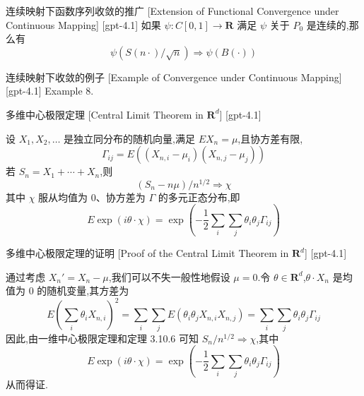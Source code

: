 \documentclass[UTF8]{ctexart}
\begin{document}
    
    
    \begin{thm}
        {连续映射下函数序列收敛的推广}
        [Extension of Functional Convergence under Continuous Mapping]
        [gpt-4.1]
        如果 $\psi : C[0, 1] \to \mathbf{R}$ 满足 $\psi$ 关于 $P_0$ 是连续的,那么有
\[
\psi(S(n\cdot)/\sqrt{n}) \Rightarrow \psi(B(\cdot))
\]

    \end{thm}
    
    
    
    \begin{xmp}
        {连续映射下收敛的例子}
        [Example of Convergence under Continuous Mapping]
        [gpt-4.1]
        Example 8.
    \end{xmp}
    
    
    
    \begin{thm}
        {多维中心极限定理}
        [Central Limit Theorem in $\mathbf{R}^d$]
        [gpt-4.1]
        
设 $X_1, X_2, \ldots$ 是独立同分布的随机向量,满足 $E X_n = \mu$,且协方差有限,
\[
\Gamma_{ij} = E \left( (X_{n,i} - \mu_i)(X_{n,j} - \mu_j) \right)
\]
若 $S_n = X_1 + \cdots + X_n$,则
\[(S_n - n\mu)/n^{1/2} \Rightarrow \chi\]
其中 $\chi$ 服从均值为 $0$、协方差为 $\Gamma$ 的多元正态分布,即
\[
E \exp(i \theta \cdot \chi) = \exp \left( - \frac{1}{2} \sum_i \sum_j \theta_i \theta_j \Gamma_{ij} \right)
\]

    \end{thm}
    
    
    
    \begin{prf}
        {多维中心极限定理的证明}
        [Proof of the Central Limit Theorem in $\mathbf{R}^d$]
        [gpt-4.1]
        
通过考虑 $X_n' = X_n - \mu$,我们可以不失一般性地假设 $\mu = 0$.令 $\theta \in \mathbf{R}^d$,$\theta \cdot X_n$ 是均值为 0 的随机变量,其方差为
\[
E \left( \sum_i \theta_i X_{n,i} \right)^2 = \sum_i \sum_j E \left( \theta_i \theta_j X_{n,i} X_{n,j} \right) = \sum_i \sum_j \theta_i \theta_j \Gamma_{ij}
\]
因此,由一维中心极限定理和定理 3.10.6 可知 $S_n / n^{1/2} \Rightarrow \chi$,其中
\[
E \exp(i \theta \cdot \chi) = \exp \left( - \frac{1}{2} \sum_i \sum_j \theta_i \theta_j \Gamma_{ij} \right)
\]
从而得证.

    \end{prf}
    
\end{document}
